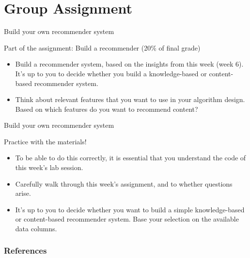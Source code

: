\documentclass[handout]{beamer}
\begin{document}
\section[Group ass]{Group Assignment}

\begin{frame}{Build your own recommender system}
	\begin{alertblock}{Part of the assignment: Build a recommender (20\% of final grade)}
		\begin{itemize}
			\item <1->Build a recommender system, based on the insights from this week (week 6). It's up to you to decide whether you build a knowledge-based or content-based recommender system.
			\item <2->Think about relevant features that you want to use in your algorithm design. Based on which features do you want to recommend content?
		\end{itemize}
	\end{alertblock}
\end{frame}

\begin{frame}{Build your own recommender system}
	\begin{exampleblock}{Practice with the materials!}
		\begin{itemize}
			\item <3-> To be able to do this correctly, it is essential that you understand the code of this week's lab session. 
			\item <4-> Carefully walk through this week's assignment, and to whether questions arise.
			\item <5-> It's up to you to decide whether you want to build a simple knowledge-based or content-based recommender system. Base your selection on the available data columns.
		\end{itemize}
	\end{exampleblock}
\end{frame}

\begin{frame}
	\frametitle{References}
	\printbibliography
\end{frame}
\end{document}
